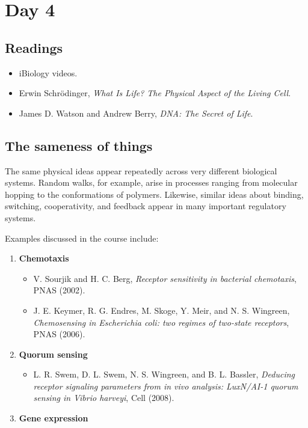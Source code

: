 \clearpage
\section{Day 4}

\subsection{Readings}

\begin{itemize}
    \item iBiology videos.
    \item Erwin Schrödinger, \textit{What Is Life? The Physical Aspect of the Living Cell}.
    \item James D. Watson and Andrew Berry, \textit{DNA: The Secret of Life}.
\end{itemize}


\subsection{The sameness of things}

The same physical ideas appear repeatedly across very different biological systems.
Random walks, for example, arise in processes ranging from molecular hopping to the conformations of polymers.
Likewise, similar ideas about binding, switching, cooperativity, and feedback appear in many important regulatory systems.

Examples discussed in the course include:

\begin{enumerate}
    \item \textbf{Chemotaxis}
    \begin{itemize}
        \item V. Sourjik and H. C. Berg, \textit{Receptor sensitivity in bacterial chemotaxis}, PNAS (2002).
        \item J. E. Keymer, R. G. Endres, M. Skoge, Y. Meir, and N. S. Wingreen, \textit{Chemosensing in Escherichia coli: two regimes of two-state receptors}, PNAS (2006).
    \end{itemize}

    \item \textbf{Quorum sensing}
    \begin{itemize}
        \item L. R. Swem, D. L. Swem, N. S. Wingreen, and B. L. Bassler, \textit{Deducing receptor signaling parameters from in vivo analysis: LuxN/AI-1 quorum sensing in Vibrio harveyi}, Cell (2008).
    \end{itemize}

    \item \textbf{Gene expression}
\end{enumerate}


